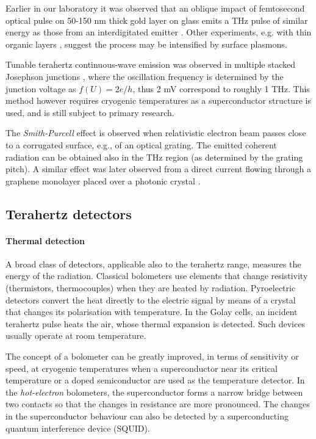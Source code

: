 Earlier in our laboratory it was observed that an oblique impact of femtosecond optical pulse on 50-150 nm thick gold layer on glass emits a THz pulse of similar energy as those from an interdigitated emitter \cite{kadlec2004optical,kadlec2005study}. Other experiments, e.g. with thin organic layers \cite{ramakrishnan2012surface}, suggest the process may be intensified by surface plasmons.

Tunable terahertz continuous-wave emission was observed in multiple stacked Josephson junctions \cite{ozyuzer2007emission}, where the oscillation frequency is determined by the junction voltage as $f(U) = 2e/h$, thus 2 mV correspond to roughly 1 THz. This method however requires cryogenic temperatures as a superconductor structure is used, and is still subject to primary research.

The \textit{Smith-Purcell} effect is observed when relativistic electron beam passes close to a corrugated surface, e.g., of an optical grating. The emitted coherent radiation can be obtained also in the THz region \cite{doucas1992first} (as determined by the grating pitch). A similar effect was later observed from a direct current flowing through a graphene monolayer placed over a photonic crystal \cite{tantiwanichapan2014graphene}.

\subsection{Terahertz detectors}
\paragraph{Thermal detection}%
A broad class of detectors, applicable also to the terahertz range, measures the energy of the radiation. 
Classical bolometers use elements that change resistivity (thermistors, thermocouples) when they are heated by radiation.
Pyroelectric detectors convert the heat directly to the electric signal by means of a crystal that changes its polarisation with temperature. In the Golay cells, an incident terahertz pulse heats the air, whose thermal expansion is detected. Such devices usually operate at room temperature.

The concept of a bolometer can be greatly improved, in terms of sensitivity or speed, at cryogenic temperatures when a superconductor near its critical temperature or a doped semiconductor are used as the temperature detector. In the \textit{hot-electron} bolometers, the superconductor forms a narrow bridge between two contacts so that the changes in resistance are more pronounced. The changes in the superconductor behaviour can also be detected by a superconducting quantum interference device (SQUID).  

